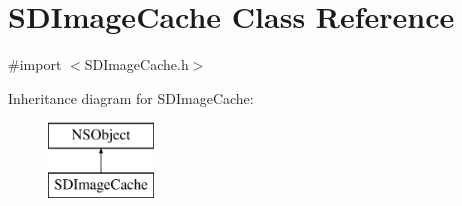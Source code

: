 \hypertarget{interface_s_d_image_cache}{}\section{S\+D\+Image\+Cache Class Reference}
\label{interface_s_d_image_cache}


{\ttfamily \#import $<$S\+D\+Image\+Cache.\+h$>$}

Inheritance diagram for S\+D\+Image\+Cache\+:\begin{figure}[H]
\begin{center}
\leavevmode
\includegraphics[height=2.000000cm]{interface_s_d_image_cache}
\end{center}
\end{figure}
